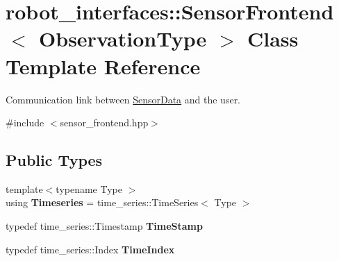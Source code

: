 \hypertarget{classrobot__interfaces_1_1SensorFrontend}{}\section{robot\+\_\+interfaces\+:\+:Sensor\+Frontend$<$ Observation\+Type $>$ Class Template Reference}
\label{classrobot__interfaces_1_1SensorFrontend}


Communication link between \hyperlink{classrobot__interfaces_1_1SensorData}{Sensor\+Data} and the user.  




{\ttfamily \#include $<$sensor\+\_\+frontend.\+hpp$>$}

\subsection*{Public Types}
\begin{DoxyCompactItemize}
\item 
{\footnotesize template$<$typename Type $>$ }\\using {\bfseries Timeseries} = time\+\_\+series\+::\+Time\+Series$<$ Type $>$\hypertarget{classrobot__interfaces_1_1SensorFrontend_a92f23f72c62ac7d32ca10742ddc5019f}{}\label{classrobot__interfaces_1_1SensorFrontend_a92f23f72c62ac7d32ca10742ddc5019f}

\item 
typedef time\+\_\+series\+::\+Timestamp {\bfseries Time\+Stamp}\hypertarget{classrobot__interfaces_1_1SensorFrontend_a28f5b6f4a74b1fd3fcd45fde6df6f0f6}{}\label{classrobot__interfaces_1_1SensorFrontend_a28f5b6f4a74b1fd3fcd45fde6df6f0f6}

\item 
typedef time\+\_\+series\+::\+Index {\bfseries Time\+Index}\hypertarget{classrobot__interfaces_1_1SensorFrontend_a199456a7768dfeec4a5c4d2a59461b8d}{}\label{classrobot__interfaces_1_1SensorFrontend_a199456a7768dfeec4a5c4d2a59461b8d}

\end{DoxyCompactItemize}
